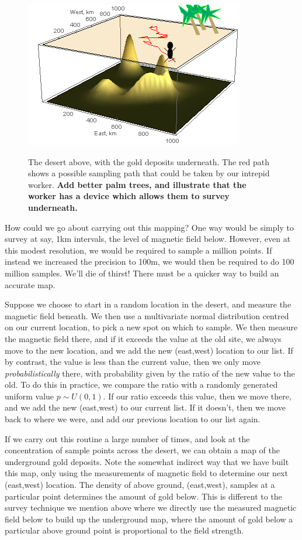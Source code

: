 \documentclass[11pt,fullpage]{book}
\begin{document}
\begin{figure}
\centering
\scalebox{0.8} 
{\includegraphics{metropolisHastings_goldMineSimple.png}}
\caption{The desert above, with the gold deposits underneath. The red path shows a possible sampling path that could be taken by our intrepid worker. \textbf{Add better palm trees, and illustrate that the worker has a device which allows them to survey underneath.}}\label{fig:metropolisHastings_goldMineSimple}
\end{figure}

How could we go about carrying out this mapping? One way would be simply to survey at say, 1km intervals, the level of magnetic field below. However, even at this modest resolution, we would be required to sample a million points. If instead we increased the precision to 100m, we would then be required to do 100 million samples. We'll die of thirst! There must be a quicker way to build an accurate map.

Suppose we choose to start in a random location in the desert, and measure the magnetic field beneath. We then use a multivariate normal distribution centred on our current location, to pick a new spot on which to sample. We then measure the magnetic field there, and if it exceeds the value at the old site, we always move to the new location, and we add the new (east,west) location to our list. If by contrast, the value is less than the current value, then we only move \textit{probabilistically} there, with probability given by the ratio of the new value to the old. To do this in practice, we compare the ratio with a randomly generated uniform value $p\sim U(0,1)$. If our ratio exceeds this value, then we move there, and we add the new (east,west) to our current list. If it doesn't, then we move back to where we were, and add our previous location to our list again.

If we carry out this routine a large number of times, and look at the concentration of sample points across the desert, we can obtain a map of the underground gold deposits. Note the somewhat indirect way that we have built this map, only using the measurements of magnetic field to determine our next (east,west) location. The density of above ground, (east,west), samples at a particular point determines the amount of gold below. This is different to the survey technique we mention above where we directly use the measured magnetic field below to build up the underground map, where the amount of gold below a particular above ground point is proportional to the field strength. 
\end{document}
